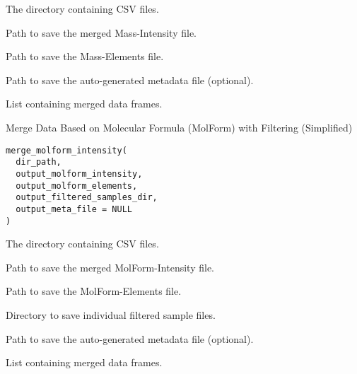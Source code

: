 \documentclass[a4paper]{book}
\begin{document}
%
\begin{Arguments}
\begin{ldescription}
\item[\code{dir\_path}] The directory containing CSV files.

\item[\code{output\_mass\_intensity}] Path to save the merged Mass-Intensity file.

\item[\code{output\_mass\_elements}] Path to save the Mass-Elements file.

\item[\code{output\_meta\_file}] Path to save the auto-generated metadata file (optional).
\end{ldescription}
\end{Arguments}
%
\begin{Value}
List containing merged data frames.
\end{Value}
%
\begin{Description}
Merge Data Based on Molecular Formula (MolForm) with Filtering (Simplified)
\end{Description}
%
\begin{Usage}
\begin{verbatim}
merge_molform_intensity(
  dir_path,
  output_molform_intensity,
  output_molform_elements,
  output_filtered_samples_dir,
  output_meta_file = NULL
)
\end{verbatim}
\end{Usage}
%
\begin{Arguments}
\begin{ldescription}
\item[\code{dir\_path}] The directory containing CSV files.

\item[\code{output\_molform\_intensity}] Path to save the merged MolForm-Intensity file.

\item[\code{output\_molform\_elements}] Path to save the MolForm-Elements file.

\item[\code{output\_filtered\_samples\_dir}] Directory to save individual filtered sample files.

\item[\code{output\_meta\_file}] Path to save the auto-generated metadata file (optional).
\end{ldescription}
\end{Arguments}
%
\begin{Value}
List containing merged data frames.
\end{Value}
\printindex{}
\end{document}
